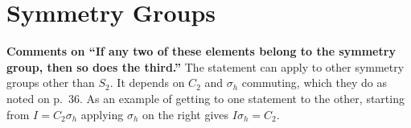 \chapter{Symmetry Groups}

{\bf Comments on ``If any two of these elements belong to the symmetry group, then so does the third.''} The statement can apply to other symmetry groups other than $S_2$. It depends on $C_2$ and $\sigma_h$ commuting, which they do as noted on p.\ 36. As an example of getting to one statement to the other, starting from $I = C_2\sigma_h$ applying $\sigma_h$ on the right gives $I\sigma_h = C_2$.
